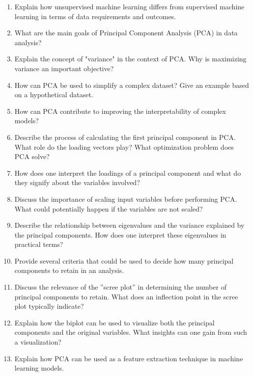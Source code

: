 \begin{enumerate}[nosep]
    \item Explain how unsupervised machine learning differs from supervised machine learning in terms of data requirements and outcomes.
    \item What are the main goals of Principal Component Analysis (PCA) in data analysis?
    \item Explain the concept of "variance" in the context of PCA. Why is maximizing variance an important objective?
    \item How can PCA be used to simplify a complex dataset? Give an example based on a hypothetical dataset.
    \item How can PCA contribute to improving the interpretability of complex models?
    \item Describe the process of calculating the first principal component in PCA. What role do the loading vectors play? What optimization problem does PCA solve?
    \item How does one interpret the loadings of a principal component and what do they signify about the variables involved?
    \item Discuss the importance of scaling input variables before performing PCA. What could potentially happen if the variables are not scaled?
    \item Describe the relationship between eigenvalues and the variance explained by the principal components. How does one interpret these eigenvalues in practical terms?
    \item Provide several criteria that could be used to decide how many principal components to retain in an analysis.
    \item Discuss the relevance of the ''scree plot'' in determining the number of principal components to retain. What does an inflection point in the scree plot typically indicate?
    \item Explain how the biplot can be used to visualize both the principal components and the original variables. What insights can one gain from such a visualization?
    \item Explain how PCA can be used as a feature extraction technique in machine learning models.
\end{enumerate}
